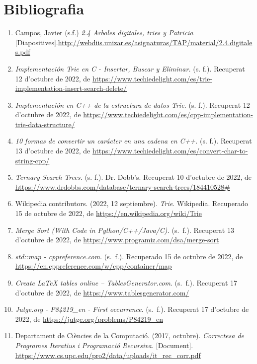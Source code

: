 \documentclass[titlepage]{article}
\begin{document}
\section{Bibliografia}
\begin{enumerate}
    \item Campos, Javier (s.f.) \textit{2.4 Arboles digitales, tries y Patricia} [Diapositives].\url{http://webdiis.unizar.es/asignaturas/TAP/material/2.4.digitales.pdf }
    \item \textit{Implementación Trie en C - Insertar, Buscar y Eliminar.} (s. f.). Recuperat 12 d'octubre de 2022, de \url{https://www.techiedelight.com/es/trie-implementation-insert-search-delete/}
    \item \textit{Implementación en C++ de la estructura de datos Trie.} (s. f.). Recuperat 12 d'octubre de 2022, de \url{https://www.techiedelight.com/es/cpp-implementation-trie-data-structure/}
    \item \textit{10 formas de convertir un carácter en una cadena en C++.} (s. f.). Recuperat 13 d'octubre de 2022, de \url{https://www.techiedelight.com/es/convert-char-to-string-cpp/}
    \item \textit{Ternary Search Trees.} (s. f.). Dr. Dobb's. Recuperat 10 d'octubre de 2022, de \url{https://www.drdobbs.com/database/ternary-search-trees/184410528#}
    \item Wikipedia contributors. (2022, 12 septiembre). \textit{Trie}. Wikipedia. Recuperado 15 de octubre de 2022, de \url{https://en.wikipedia.org/wiki/Trie}
    \item \textit{Merge Sort (With Code in Python/C++/Java/C).} (s. f.). Recuperat 13 d'octubre de 2022, de \url{https://www.programiz.com/dsa/merge-sort}
    \item \textit{std::map - cppreference.com}. (s. f.). Recuperado 15 de octubre de 2022, de
    \url{https://en.cppreference.com/w/cpp/container/map}
    \item \textit{Create LaTeX tables online – TablesGenerator.com}. (s. f.). Recuperat 17 d'octubre de 2022, de \url{https://www.tablesgenerator.com/}

    \item \textit{Jutge.org - P84219\_en - First occurrence}. (s. f.). Recuperat 17 d'octubre de 2022, de \url{https://jutge.org/problems/P84219_en}

    \item Departament de Ciències de la Computació. (2017, octubre). \textit{Correctesa de Programes Iteratius i Programació Recursiva.} [Document]. \url{https://www.cs.upc.edu/pro2/data/uploads/it_rec_corr.pdf}


\end{enumerate}
\end{document}

